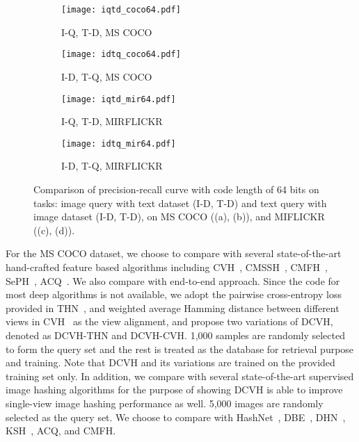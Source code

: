 \documentclass[10pt,twocolumn,letterpaper]{article}
\begin{document}
\begin{figure*}
    \centering
    \begin{subfigure}[h]{0.23\textwidth}
        \centering
        \texttt{[image: iqtd\_coco64.pdf]}
        \caption{I-Q, T-D, MS COCO}
       	\label{fig:iqtd_coco}
    \end{subfigure}%
    \begin{subfigure}[h]{0.23\textwidth}
        \centering
        \texttt{[image: idtq\_coco64.pdf]}
        \caption{I-D, T-Q, MS COCO}
        \label{fig:idtq_coco}
    \end{subfigure}
    \begin{subfigure}[h]{0.23\textwidth}
        \centering
        \texttt{[image: iqtd\_mir64.pdf]}
        \caption{I-Q, T-D, MIRFLICKR}
       	\label{fig:iqtd_coco}
    \end{subfigure}%
    \begin{subfigure}[h]{0.23\textwidth}
        \centering
        \texttt{[image: idtq\_mir64.pdf]}
        \caption{I-D, T-Q, MIRFLICKR}
        \label{fig:idtq_coco}
    \end{subfigure}
    \caption{Comparison of precision-recall curve with code length of 64 bits on tasks: image query with text dataset (I-D, T-D) and text query with image dataset (I-D, T-D), on MS COCO ((a), (b)), and MIFLICKR ((c), (d)).}
\label{fig:prcurve}
\end{figure*}


For the MS COCO dataset, we choose to compare with several state-of-the-art hand-crafted feature based algorithms including CVH~\cite{cvh}, CMSSH~\cite{cmssh}, CMFH~\cite{cmfh}, SePH~\cite{seph}, ACQ~\cite{acq}. We also compare with end-to-end approach. Since the code for most deep algorithms is not available, we adopt the pairwise cross-entropy loss provided in THN~\cite{THN}, and weighted average Hamming distance between different views in CVH~\cite{cvh} as the view alignment, and propose two variations of DCVH, denoted as DCVH-THN and DCVH-CVH. 1,000 samples are randomly selected to form the query set and the rest is treated as the database for retrieval purpose and training. Note that DCVH and its variations are trained on the provided training set only. In addition, we compare with several state-of-the-art supervised image hashing algorithms for the purpose of showing DCVH is able to improve single-view image hashing performance as well. 5,000 images are randomly selected as the query set. We choose to compare with HashNet~\cite{hashnet}, DBE~\cite{dbe}, DHN~\cite{dhn}, KSH~\cite{ksh}, ACQ, and CMFH.
\end{document}
